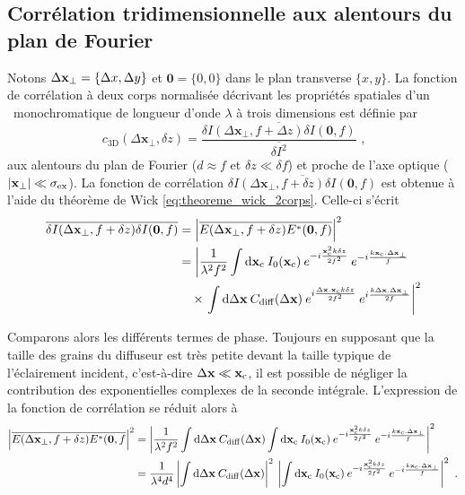 \subsection{Corrélation tridimensionnelle aux alentours du plan de Fourier}
Notons $\Delta\mathbf{x}_{\perp}=\lbrace \Delta x, \Delta y\rbrace$ et $\mathbf{0}=\lbrace 0,0 \rbrace$ dans le plan transverse $\lbrace x,y \rbrace$. La fonction de corrélation à deux corps normalisée décrivant les propriétés spatiales d'un \speckle\ monochromatique de longueur d'onde $\lambda$ à trois dimensions est définie par 
\begin{equation}
c_{\mathrm{3D}}(\Delta \mathbf{x}_{\perp},\delta z)=\frac{\overline{\delta I(\Delta \mathbf{x}_{\perp}, f+\Delta z) \delta I(\mathbf{0}, f)}}{\overline{\delta I^2}} \text{ ,}
\end{equation}
aux alentours du plan de Fourier ($d\approx f$ et $\delta z \ll \delta f$) et proche de l'axe optique ($|\mathbf{x}_{\perp}|\ll \sigma_{\mathrm{ex}}$). La fonction de corrélation $\overline{\delta I(\Delta\mathbf{x}_{\perp},f+\delta z) \delta I(\mathbf{0}, f)}$ est obtenue à l'aide du théorème de Wick \ref{eq:theoreme_wick_2corps}. Celle-ci s'écrit
\begin{align}
\overline{\delta I (\Delta\mathbf{x}_{\perp}, f+\delta z) \delta I(\mathbf{0},f)} &= \left| \overline{E(\Delta\mathbf{x}_{\perp},f+\delta z)E^*(\mathbf{0},f)} \right|^2 \\
&= \left| \frac{1}{\lambda^2 f^2} \int{\mathop{}\mathopen{}\mathrm{d}\mathbf{x}_{\mathrm{c}}\: I_0(\mathbf{x}_{\mathrm{c}}) \: e^{-i\frac{\mathbf{x}_{\mathrm{c}}^2 k \delta z}{2f^2}} \: e^{-i\frac{k \mathbf{x}_{\mathrm{c}}. \Delta\mathbf{x}_{\perp}}{f}}}\right. \\
&\nonumber \quad\times \left.\int{\mathop{}\mathopen{}\mathrm{d}\Delta\mathbf{x}\: C_{\mathrm{diff}}(\Delta\mathbf{x}) \: e^{i\frac{\Delta\mathbf{x}. \mathbf{x}_{\mathrm{c}}k \delta z}{2 f^2}} \: e^{i\frac{k\Delta\mathbf{x}. \Delta\mathbf{x}_{\perp}}{2f}}} \right|^2
\end{align}

Comparons alors les différents termes de phase. Toujours en supposant que la taille des grains du diffuseur est très petite devant la taille typique de l'éclairement incident, c'est-à-dire $\Delta\mathbf{x} \ll \mathbf{x}_{\mathrm{c}}$, il est possible de négliger la contribution des exponentielles complexes de la seconde intégrale. L'expression de la fonction de corrélation se réduit alors à
\begin{align}
{\left| \overline{E(\Delta\mathbf{x}_{\perp},f+\delta z)E^*(\mathbf{0},f}\right|}^2 &= {\left| \frac{1}{\lambda^2 f^2}  \int{\mathop{}\mathopen{}\mathrm{d}\Delta\mathbf{x}\: C_{\mathrm{diff}}(\Delta\mathbf{x})} \int{\mathop{}\mathopen{}\mathrm{d}\mathbf{x}_{\mathrm{c}}\: I_0(\mathbf{x}_{\mathrm{c}}) \: e^{-i\frac{\mathbf{x}_{\mathrm{c}}^2 k \delta z}{2f^2}} \: e^{-i \frac{k \mathbf{x}_{\mathrm{c}}. \Delta\mathbf{x}_{\perp}}{f}}} \right|}^2 \\
&= \frac{1}{\lambda^4 d^4} \left|\int{\mathop{}\mathopen{}\mathrm{d}\Delta\mathbf{x}\: C_{\mathrm{diff}}(\Delta\mathbf{x})}\right|^2 \: \left|\int{\mathop{}\mathopen{}\mathrm{d}\mathbf{x}_{\mathrm{c}}\: I_0(\mathbf{x}_{\mathrm{c}}) \: e^{-i\frac{\mathbf{x}_{\mathrm{c}}^2 k\delta z}{2f^2}} \: e^{-i\frac{k\mathbf{x}_{\mathrm{c}}.\Delta\mathbf{x}_{\perp}}{f}}} \right|^2 \text{ .}
\end{align}

